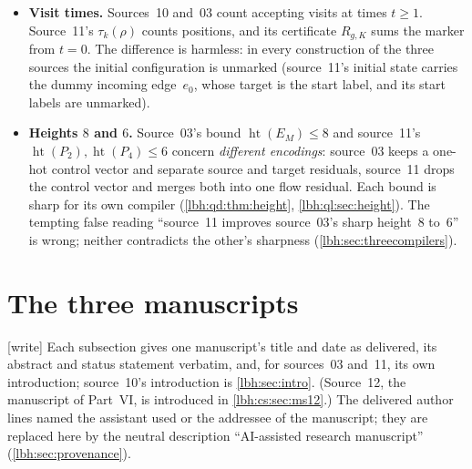 \documentclass[11pt,letterpaper]{article}
\theoremstyle{definition}
\theoremstyle{remark}
\DeclareMathOperator{\htp}{ht}%
\newcommand{\1}{\mathbf 1}
\newcommand{\wtag}{\textup{[write]}}%
\begin{document}
\begin{itemize}
relabelling $d=1+2a$, and source~11's integer code $N(w)$ is base three. Source~10's $\eta$ is
something else: the real code of a whole schedule (\cref{lbh:eq:eta}). The letter $\rho$ also
names a run in source~11.
\item \textbf{Visit times.} Sources~10 and~03 count accepting visits at times $t\ge1$.
Source~11's $\tau_k(\rho)$ counts positions, and its certificate $R_{g,K}$ sums the marker from
$t=0$. The difference is harmless: in every construction of the three sources the initial
configuration is unmarked (source~11's initial state carries the dummy incoming edge~$e_0$,
whose target is the start label, and its start labels are unmarked).
\item \textbf{Heights $8$ and $6$.} Source~03's bound $\htp(E_M)\le8$ and source~11's
$\htp(P_2),\htp(P_4)\le6$ concern \emph{different encodings}: source~03 keeps a one-hot
control vector and separate source and target residuals, source~11 drops the control vector and
merges both into one flow residual. Each bound is sharp for its own compiler
(\cref{lbh:qd:thm:height}, \cref{lbh:ql:sec:height}). The tempting false reading ``source~11
improves source~03's sharp height~$8$ to~$6$'' is wrong; neither contradicts the other's
sharpness (\cref{lbh:sec:threecompilers}).
\end{itemize}
\section{The three manuscripts}\label{lbh:sec:manuscripts}
\wtag{} Each subsection gives one manuscript's title and date as delivered, its abstract and
status statement verbatim, and, for sources~03 and~11, its own introduction; source~10's
introduction is \cref{lbh:sec:intro}. (Source~12, the manuscript of Part~VI, is introduced in
\cref{lbh:cs:sec:ms12}.) The delivered author lines named the assistant used or the
addressee of the manuscript; they are replaced here by the neutral description ``AI-assisted
research manuscript'' (\cref{lbh:sec:provenance}).
\end{document}
